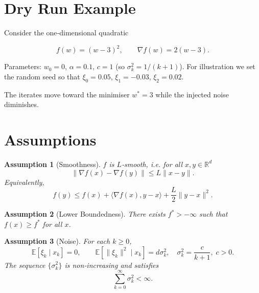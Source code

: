 \documentclass{article}
\newtheorem{assumption}{Assumption}
\newcommand{\E}{\mathbb{E}}
\newcommand{\R}{\mathbb{R}}
\begin{document}
\section*{Dry Run Example}
Consider the one‑dimensional quadratic  

\[
f(w)=(w-3)^{2},\qquad \nabla f(w)=2(w-3).
\]

Parameters: $w_{0}=0$, $\alpha=0.1$, $c=1$ (so $\sigma_{k}^{2}=1/(k+1)$).  
For illustration we set the random seed so that $\xi_{0}=0.05$, $\xi_{1}=-0.03$, $\xi_{2}=0.02$.

The iterates move toward the minimiser $w^{*}=3$ while the injected noise
diminishes.

\section*{Assumptions}
\begin{assumption}[Smoothness]\label{ass:smooth}
$f$ is $L$‑smooth, i.e. for all $x,y\in\R^{d}$
\[
\|\nabla f(x)-\nabla f(y)\|\le L\|x-y\| .
\tag{A1}
\]
Equivalently,
\[
f(y)\le f(x)+\langle\nabla f(x),y-x\rangle+\frac{L}{2}\|y-x\|^{2}.
\tag{A1'}
\]
\end{assumption}

\begin{assumption}[Lower Boundedness]\label{ass:lower}
There exists $f^{*}>-\infty$ such that $f(x)\ge f^{*}$ for all $x$.
\end{assumption}

\begin{assumption}[Noise]\label{ass:noise}
For each $k$,
\[
\E[\xi_{k}\mid x_{k}]=0,\qquad 
\E[\|\xi_{k}\|^{2}\mid x_{k}]=d\sigma_{k}^{2},
\quad\sigma_{k}^{2}= \frac{c}{k+1},\;c>0 .
\tag{A3}
\]
The sequence $\{\sigma_{k}^{2}\}$ is non‑increasing and satisfies
\[
\sum_{k=0}^{\infty}\sigma_{k}^{2}<\infty .
\tag{A3'}
\]
\end{assumption}
\end{document}
